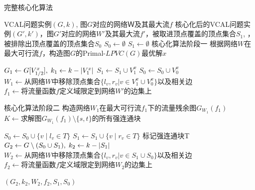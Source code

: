 \begin{algorithm}
\caption{完整核心化算法}
\begin{algorithmic}[1]
\Require VCAL问题实例$(G,k)$, 图$G$对应的网络Ｗ及其最大流$f$
\Ensure  核心化后的VCAL问题实例$(G',k')$，图$G'$对应的网络$W'$及其最大流$f'$，被取进顶点覆盖的顶点集合$S_1$,
        ，被排除出顶点覆盖的顶点集合$S_0$
\algrule
{}
    \State $S_0 \gets \emptyset$
    \State $S_1 \gets \emptyset$
    \State \Comment 核心化算法阶段一
    \State 根据网络$W$在最大可行流$f$，构造图$G$的Primal-$LPVC(G)$最优解$x$

    \State $G_1 \gets G[V^x_{1/2}],\;k_1 \gets k - \left\vert V^x_1 \right\vert$
    \State $S_1 \gets S_1 \cup V^x_1$
    \State $S_0 \gets S_0 \cup V^x_0$
    \State $W_1 \gets \text{从网络$W$中移除顶点集合}\{l_v, r_v | v \in V^x_1 \cup V^x_0\}\text{以及相关边}$
    \State $f_1 \gets \text{将流量函数$f$定义域限定到网络$W'$的边集上}$

    \State \Comment 核心化算法阶段二
    \State 构造网络$W_1$在最大可行流$f_1$下的流量残余图$G_{W_1}(f_1)$
    \State $K \gets \text{求解图$G_{W_1}(f_1) \setminus \{s, t\}$的所有强连通块}$

            \State $S_0 \gets S_0 \cup \{v\;|\;l_v \in T\}$
            \State $S_1 \gets S_1 \cup \{v\;|\;r_v \in T\}$
            \State 标记强连通块T
        \EndIf
    \EndFor
    \State $G_2 \gets G \setminus (S_0 \cup S_1),\;k_2 \gets k - \left\vert S_1 \right\vert$
    \State $W_2 \gets \text{从网络$W$中移除顶点集合}\{l_v, r_v | v \in S_1 \cup S_0\}\text{以及相关边}$
    \State $f_2 \gets \text{将流量函数$f$定义域限定到网络$W_2$的边集上}$

    \State \Return $(G_2, k_2, W_2, f_2, S_1, S_0)$
\EndFunction
\end{algorithmic}
\end{algorithm} 